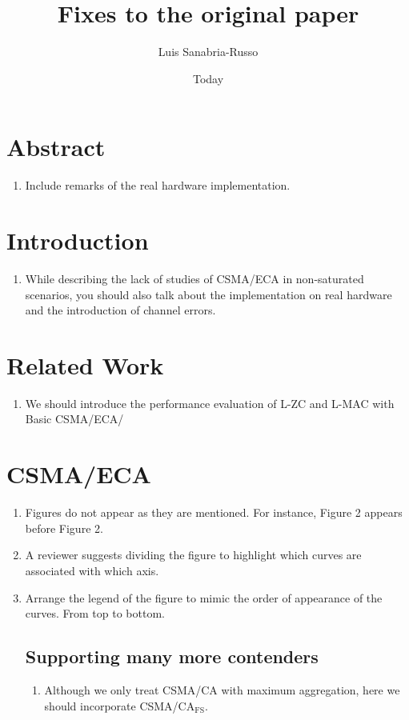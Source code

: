 \documentclass[]{article}
\begin{document}
\title{Fixes to the original paper}
\author{Luis Sanabria-Russo}
\date{Today}
\maketitle

\section{Abstract}
\begin{enumerate}
	\item Include remarks of the real hardware implementation.
\end{enumerate}

\section{Introduction}
\begin{enumerate}
	\item While describing the lack of studies of CSMA/ECA in non-saturated scenarios, you should also talk about the implementation on real hardware and the introduction of channel errors.
\end{enumerate}

\section{Related Work}
\begin{enumerate}
	\item We should introduce the performance evaluation of L-ZC and L-MAC with Basic CSMA/ECA/
\end{enumerate}

\section{CSMA/ECA}
\begin{enumerate}
	\item Figures do not appear as they are mentioned. For instance, Figure 2 appears before Figure 2.
	\item A reviewer suggests dividing the figure to highlight which curves are associated with which axis. 
	\item Arrange the legend of the figure to mimic the order of appearance of the curves. From top to bottom.
	\subsection{Supporting many more contenders}
	\begin{enumerate}
		\item Although we only treat CSMA/CA with maximum aggregation, here we should incorporate CSMA/CA$_{\text{FS}}$.
	\end{enumerate}
\end{enumerate}
\end{document}
